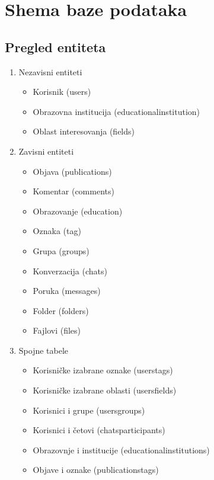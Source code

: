 \section{Shema baze podataka}
\subsection{Pregled entiteta}
\begin{enumerate}
    \item Nezavisni entiteti
        \begin{itemize}
            \item Korisnik (users)
            \item Obrazovna institucija (educational\textunderscore institution)
            \item Oblast interesovanja (fields)
        \end{itemize}
    \item Zavisni entiteti
        \begin{itemize}
            \item Objava (publications)
            \item Komentar (comments)
            \item Obrazovanje (education)
            \item Oznaka (tag)
            \item Grupa (groups)
            \item Konverzacija (chats)
            \item Poruka (messages)
            \item Folder (folders)
            \item Fajlovi (files)
        \end{itemize}
    \item Spojne tabele
        \begin{itemize}
            \item Korisničke izabrane oznake (users\textunderscore tags)
            \item Korisničke izabrane oblasti (users\textunderscore fields)
            \item Korisnici i grupe (users\textunderscore groups)
            \item Korisnici i četovi (chats\textunderscore participants)
            \item Obrazovnje i institucije (educational\textunderscore institutions)
            \item Objave i oznake (publications\textunderscore tags)
        \end{itemize}
\end{enumerate}
